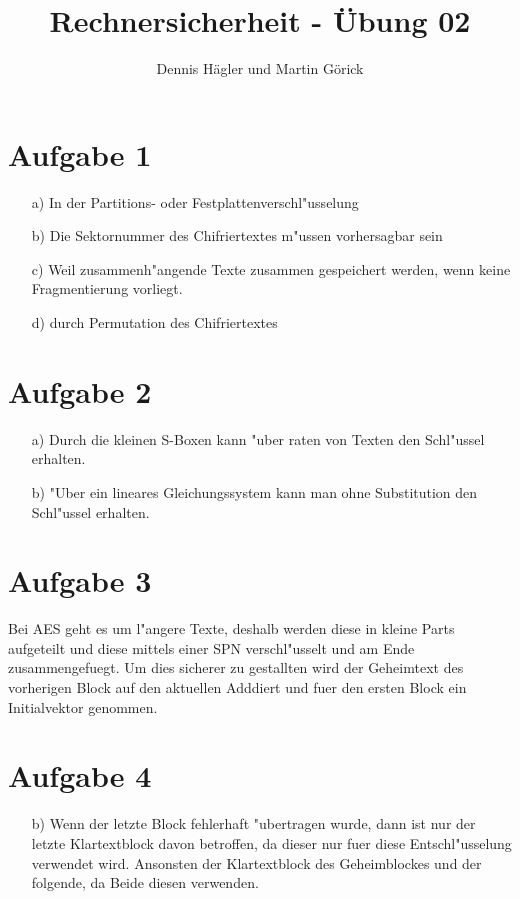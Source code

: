 \documentclass{scrartcl}
\title{Rechnersicherheit - Übung 02}
\author{Dennis Hägler und Martin Görick}
\begin{document}
\maketitle


\section{Aufgabe 1}
\begin{itemize}
\item[a)] In der Partitions- oder Festplattenverschl"usselung
\item[b)] Die Sektornummer des Chifriertextes m"ussen vorhersagbar sein
\item[c)] Weil zusammenh"angende Texte zusammen gespeichert werden, wenn keine Fragmentierung vorliegt.
\item[d)] durch Permutation des Chifriertextes
\end{itemize}

\section{Aufgabe 2}
\begin{itemize}
\item[a)] Durch die kleinen S-Boxen kann "uber raten von Texten den Schl"ussel erhalten.
\item[b)] "Uber ein lineares Gleichungssystem kann man ohne Substitution den Schl"ussel erhalten.
\end{itemize}

\section{Aufgabe 3}
Bei AES geht es um l"angere Texte, deshalb werden diese in kleine Parts aufgeteilt und diese mittels einer SPN verschl"usselt und am Ende zusammengefuegt. Um dies sicherer zu gestallten wird der Geheimtext des vorherigen Block auf den aktuellen Adddiert und fuer den ersten Block ein Initialvektor genommen.

\section{Aufgabe 4}
\begin{itemize}
\item[b)] Wenn der letzte Block fehlerhaft "ubertragen wurde, dann ist nur der letzte Klartextblock davon betroffen, da dieser nur fuer diese Entschl"usselung verwendet wird. Ansonsten der Klartextblock des Geheimblockes und der folgende, da Beide diesen verwenden.
\end{itemize}
\end{document}
